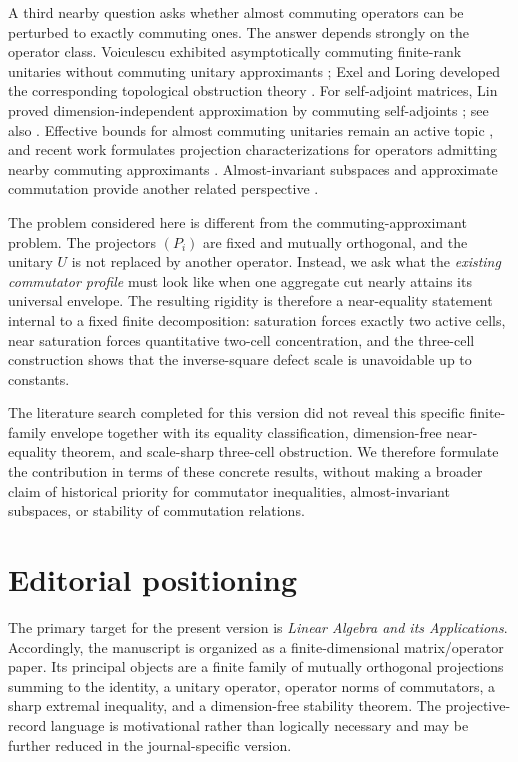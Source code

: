 \documentclass[11pt]{article}
\begin{document}
A third nearby question asks whether almost commuting operators can be
perturbed to exactly commuting ones.  The answer depends strongly on the
operator class.  Voiculescu exhibited asymptotically commuting finite-rank
unitaries without commuting unitary approximants
\cite{Voiculescu1983}; Exel and Loring developed the corresponding
topological obstruction theory \cite{ExelLoring1989,ExelLoring1991}.  For
self-adjoint matrices, Lin proved dimension-independent approximation by
commuting self-adjoints \cite{Lin1997AlmostCommuting}; see also
\cite{FriisRordam1996,Hastings2009}.  Effective bounds for almost commuting
unitaries remain an active topic \cite{DorOnHallKachkovskiy2025}, and recent
work formulates projection characterizations for operators admitting nearby
commuting approximants \cite{Herrera2024,Herrera2026}.  Almost-invariant
subspaces and approximate commutation provide another related perspective
\cite{MarcouxPopovRadjavi2013}.

The problem considered here is different from the commuting-approximant
problem.  The projectors $(P_i)$ are fixed and mutually orthogonal, and the
unitary $U$ is not replaced by another operator.  Instead, we ask what the
\emph{existing commutator profile} must look like when one aggregate cut
nearly attains its universal envelope.  The resulting rigidity is therefore
a near-equality statement internal to a fixed finite decomposition:
saturation forces exactly two active cells, near saturation forces
quantitative two-cell concentration, and the three-cell construction shows
that the inverse-square defect scale is unavoidable up to constants.

The literature search completed for this version did not reveal this specific
finite-family envelope together with its equality classification,
dimension-free near-equality theorem, and scale-sharp three-cell obstruction.
We therefore formulate the contribution in terms of these concrete results,
without making a broader claim of historical priority for commutator
inequalities, almost-invariant subspaces, or stability of commutation
relations.

\section{Editorial positioning}

The primary target for the present version is \emph{Linear Algebra and its
Applications}.  Accordingly, the manuscript is organized as a
finite-dimensional matrix/operator paper.  Its principal objects are a finite
family of mutually orthogonal projections summing to the identity, a unitary
operator, operator norms of commutators, a sharp extremal inequality, and a
dimension-free stability theorem.  The projective-record language is
motivational rather than logically necessary and may be further reduced in
the journal-specific version.
\end{document}
